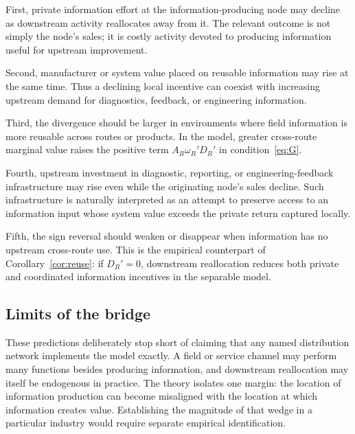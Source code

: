 First, private information effort at the information-producing node may decline as downstream activity reallocates away from it. The relevant outcome is not simply the node's sales; it is costly activity devoted to producing information useful for upstream improvement.

Second, manufacturer or system value placed on reusable information may rise at the same time. Thus a declining local incentive can coexist with increasing upstream demand for diagnostics, feedback, or engineering information.

Third, the divergence should be larger in environments where field information is more reusable across routes or products. In the model, greater cross-route marginal value raises the positive term $A_R\omega_R'D_R'$ in condition~\eqref{eq:G}.

Fourth, upstream investment in diagnostic, reporting, or engineering-feedback infrastructure may rise even while the originating node's sales decline. Such infrastructure is naturally interpreted as an attempt to preserve access to an information input whose system value exceeds the private return captured locally.

Fifth, the sign reversal should weaken or disappear when information has no upstream cross-route use. This is the empirical counterpart of Corollary~\ref{cor:reuse}: if $D_R'=0$, downstream reallocation reduces both private and coordinated information incentives in the separable model.

\subsection{Limits of the bridge}

These predictions deliberately stop short of claiming that any named distribution network implements the model exactly. A field or service channel may perform many functions besides producing information, and downstream reallocation may itself be endogenous in practice. The theory isolates one margin: the location of information production can become misaligned with the location at which information creates value. Establishing the magnitude of that wedge in a particular industry would require separate empirical identification.
